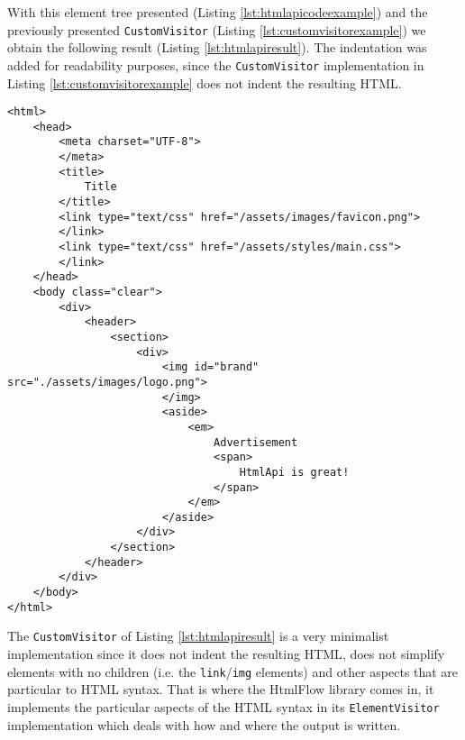 \noindent
With this element tree presented (Listing \ref{lst:htmlapicodeexample}) and the previously presented \texttt{CustomVisitor} (Listing \ref{lst:customvisitorexample}) we obtain the following result (Listing \ref{lst:htmlapiresult}). The indentation was added for readability purposes, since the \texttt{CustomVisitor} implementation in Listing \ref{lst:customvisitorexample} does not indent the resulting \ac{HTML}.

\bigskip


\begin{minipage}{\linewidth}
\begin{lstlisting}[caption={HtmlApi - The Result of the Element Tree Visit},label={lst:htmlapiresult}]
<html>
    <head>
        <meta charset="UTF-8">
        </meta>
        <title>
            Title
        </title>
        <link type="text/css" href="/assets/images/favicon.png">
        </link>
        <link type="text/css" href="/assets/styles/main.css">
        </link>
    </head>
    <body class="clear">
        <div>
            <header>
                <section>
                    <div>
                        <img id="brand" src="./assets/images/logo.png">
                        </img>
                        <aside>
                            <em>
                                Advertisement
                                <span>
                                    HtmlApi is great!
                                </span>
                            </em>
                        </aside>
                    </div>
                </section>
            </header>
        </div>
    </body>
</html>                          
\end{lstlisting}
\end{minipage}

\noindent
The \texttt{CustomVisitor} of Listing \ref{lst:htmlapiresult} is a very minimalist implementation since it does not indent the resulting \ac{HTML}, does not simplify elements with no children (i.e. the \texttt{link}/\texttt{img} elements) and other aspects that are particular to \ac{HTML} syntax. That is where the HtmlFlow library comes in, it implements the particular aspects of the \ac{HTML} syntax in its \texttt{ElementVisitor} implementation which deals with how and where the output is written.